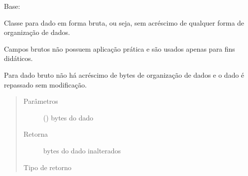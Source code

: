 \documentclass[letterpaper,10pt,brazil]{sphinxmanual}
\begin{document}
\begin{fulllineitems}
\label{\detokenize{estrutarq.dado:estrutarq.dado.DadoBruto}}
\pysigstartsignatures
{}
\pysigstopsignatures
\sphinxAtStartPar
Base: {\hyperref[\detokenize{estrutarq.dado:estrutarq.dado.DadoBasico}]{}}

\sphinxAtStartPar
Classe para dado em forma bruta, ou seja, sem acréscimo de qualquer forma
de organização de dados.

\sphinxAtStartPar
Campos brutos não possuem aplicação prática e são usados apenas para fins
didáticos.

\begin{fulllineitems}
\label{\detokenize{estrutarq.dado:estrutarq.dado.DadoBruto.adicione_formatacao}}
\pysigstartsignatures
{}
\pysigstopsignatures
\sphinxAtStartPar
Para dado bruto não há acréscimo de bytes de organização de dados e
o dado é repassado sem modificação.
\begin{quote}\begin{description}
\item[{Parâmetros}] \leavevmode
\sphinxAtStartPar
{} () \textendash{} bytes do dado

\item[{Retorna}] \leavevmode
\sphinxAtStartPar
bytes do dado inalterados

\item[{Tipo de retorno}] \leavevmode
\sphinxAtStartPar
{}

\end{description}\end{quote}

\end{fulllineitems}


\end{fulllineitems}
\end{document}
